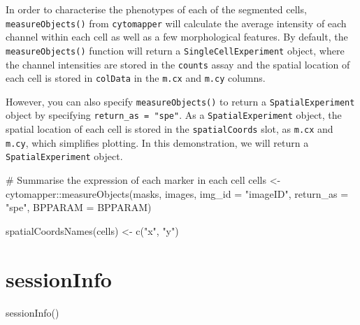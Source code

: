 \documentclass[
  letterpaper,
  DIV=11,
  numbers=noendperiod]{scrreprt}
\newenvironment{Shaded}{\begin{snugshade}}{\end{snugshade}}
\newcommand{\AttributeTok}[1]{\textcolor[rgb]{0.40,0.45,0.13}{#1}}
\newcommand{\CommentTok}[1]{\textcolor[rgb]{0.37,0.37,0.37}{#1}}
\newcommand{\FunctionTok}[1]{\textcolor[rgb]{0.28,0.35,0.67}{#1}}
\newcommand{\NormalTok}[1]{\textcolor[rgb]{0.00,0.23,0.31}{#1}}
\newcommand{\OtherTok}[1]{\textcolor[rgb]{0.00,0.23,0.31}{#1}}
\newcommand{\SpecialCharTok}[1]{\textcolor[rgb]{0.37,0.37,0.37}{#1}}
\newcommand{\StringTok}[1]{\textcolor[rgb]{0.13,0.47,0.30}{#1}}
\begin{document}
In order to characterise the phenotypes of each of the segmented cells,
\texttt{measureObjects()} from \texttt{cytomapper} will calculate the
average intensity of each channel within each cell as well as a few
morphological features. By default, the \texttt{measureObjects()}
function will return a \texttt{SingleCellExperiment} object, where the
channel intensities are stored in the \texttt{counts} assay and the
spatial location of each cell is stored in \texttt{colData} in the
\texttt{m.cx} and \texttt{m.cy} columns.

However, you can also specify \texttt{measureObjects()} to return a
\texttt{SpatialExperiment} object by specifying
\texttt{return\_as\ =\ "spe"}. As a \texttt{SpatialExperiment} object,
the spatial location of each cell is stored in the
\texttt{spatialCoords} slot, as \texttt{m.cx} and \texttt{m.cy}, which
simplifies plotting. In this demonstration, we will return a
\texttt{SpatialExperiment} object.

\begin{Shaded}
\begin{Highlighting}[]
\CommentTok{\# Summarise the expression of each marker in each cell}
\NormalTok{cells }\OtherTok{\textless{}{-}}\NormalTok{ cytomapper}\SpecialCharTok{::}\FunctionTok{measureObjects}\NormalTok{(masks,}
\NormalTok{                                    images,}
                                    \AttributeTok{img\_id =} \StringTok{"imageID"}\NormalTok{,}
                                    \AttributeTok{return\_as =} \StringTok{"spe"}\NormalTok{,}
                                    \AttributeTok{BPPARAM =}\NormalTok{ BPPARAM)}

\FunctionTok{spatialCoordsNames}\NormalTok{(cells) }\OtherTok{\textless{}{-}} \FunctionTok{c}\NormalTok{(}\StringTok{"x"}\NormalTok{, }\StringTok{"y"}\NormalTok{)}
\end{Highlighting}
\end{Shaded}

\section{sessionInfo}\label{sessioninfo}

\begin{Shaded}
\begin{Highlighting}[]
\FunctionTok{sessionInfo}\NormalTok{()}
\end{Highlighting}
\end{Shaded}
\end{document}
